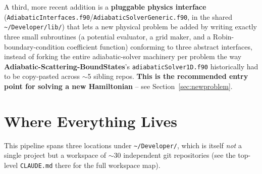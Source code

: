 \documentclass[11pt]{article}
\newcommand{\file}[1]{\texttt{#1}}
\newcommand{\repo}[1]{\textbf{#1}}
\begin{document}
A third, more recent addition is a \textbf{pluggable physics interface}
(\file{AdiabaticInterfaces.f90}/\file{AdiabaticSolverGeneric.f90}, in the shared
\texttt{\textasciitilde/Developer/lib/}) that lets a new physical problem be added by
writing exactly three small subroutines (a potential evaluator, a grid maker, and a
Robin-boundary-condition coefficient function) conforming to three abstract interfaces, instead of
forking the entire adiabatic-solver machinery per problem the way
\repo{Adiabatic-Scattering-BoundStates}'s \file{adiabaticSolver1D.f90} historically had to be
copy-pasted across $\sim$5 sibling repos. \textbf{This is the recommended entry point for solving
a new Hamiltonian} -- see Section~\ref{sec:newproblem}.

\section{Where Everything Lives}

This pipeline spans three locations under \texttt{\textasciitilde/Developer/}, which is
itself \emph{not} a single project but a workspace of $\sim$30 independent git repositories (see
the top-level \texttt{CLAUDE.md} there for the full workspace map).
\end{document}
